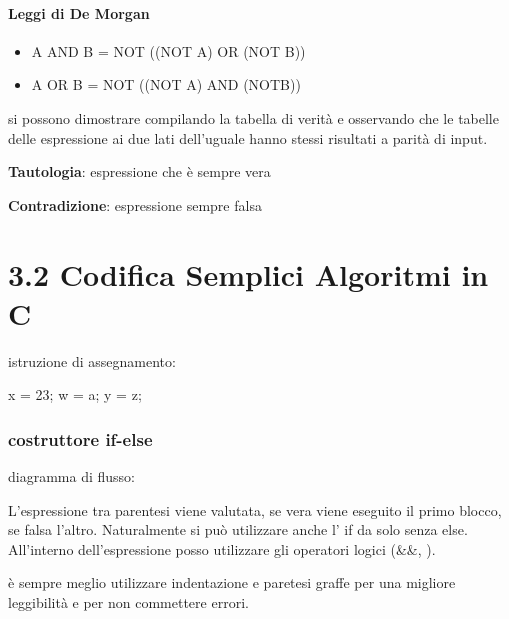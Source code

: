 \documentclass[
  paper=a4,
  oneside  ,captions=tableheading
]{scrbook}
\newenvironment{Shaded}{}{}
\newcommand{\CharTok}[1]{\textcolor[rgb]{0.25,0.44,0.63}{#1}}
\newcommand{\DecValTok}[1]{\textcolor[rgb]{0.25,0.63,0.44}{#1}}
\newcommand{\NormalTok}[1]{#1}
\providecommand{\tightlist}{%
  \setlength{\itemsep}{0pt}\setlength{\parskip}{0pt}}
\begin{document}
\hypertarget{leggi-di-de-morgan}{%
\paragraph{Leggi di De Morgan}\label{leggi-di-de-morgan}}

\begin{itemize}
\tightlist
\item
  A AND B = NOT ((NOT A) OR (NOT B))
\item
  A OR B = NOT ((NOT A) AND (NOTB))
\end{itemize}

si possono dimostrare compilando la tabella di verità e osservando che
le tabelle delle espressione ai due lati dell'uguale hanno stessi
risultati a parità di input.

\textbf{Tautologia}: espressione che è sempre vera

\textbf{Contradizione}: espressione sempre falsa

\hypertarget{codifica-semplici-algoritmi-in-c}{%
\section{3.2 Codifica Semplici Algoritmi in
C}\label{codifica-semplici-algoritmi-in-c}}

istruzione di assegnamento:

\begin{Shaded}
\begin{Highlighting}[]
\NormalTok{x = }\DecValTok{23}\NormalTok{;}
\NormalTok{w = }\CharTok{\textquotesingle{}a\textquotesingle{}}\NormalTok{;}
\NormalTok{y = z;}
\end{Highlighting}
\end{Shaded}

\hypertarget{costruttore-if-else}{%
\subsubsection{\texorpdfstring{\textbf{costruttore
if-else}}{costruttore if-else}}\label{costruttore-if-else}}

diagramma di flusso:

L'espressione tra parentesi viene valutata, se vera viene eseguito il
primo blocco, se falsa l'altro. Naturalmente si può utilizzare anche l'
if da solo senza else. All'interno dell'espressione posso utilizzare gli
operatori logici (\&\&, \textbar\textbar).

è sempre meglio utilizzare indentazione e paretesi graffe per una
migliore leggibilità e per non commettere errori.
\end{document}
